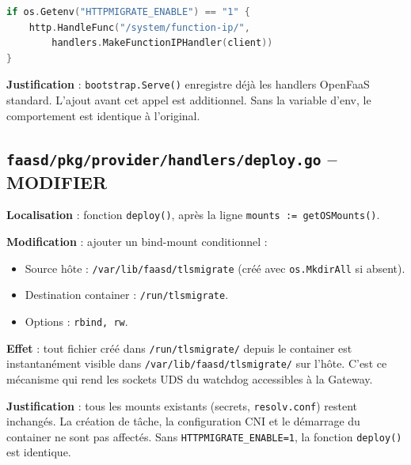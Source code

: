 \documentclass[11pt,a4paper]{article}
\begin{document}
\begin{lstlisting}[language=Go]
if os.Getenv("HTTPMIGRATE_ENABLE") == "1" {
    http.HandleFunc("/system/function-ip/",
        handlers.MakeFunctionIPHandler(client))
}
\end{lstlisting}

\textbf{Justification} : \texttt{bootstrap.Serve()} enregistre déjà les handlers
OpenFaaS standard. L'ajout avant cet appel est additionnel. Sans la variable d'env,
le comportement est identique à l'original.


\subsection{\texttt{faasd/pkg/provider/handlers/deploy.go} -- MODIFIER}
\label{sec:deploy}

\textbf{Localisation} : fonction \texttt{deploy()}, après la ligne \texttt{mounts := getOSMounts()}.

\textbf{Modification} : ajouter un bind-mount conditionnel :
\begin{itemize}
  \item Source hôte : \texttt{/var/lib/faasd/tlsmigrate} (créé avec \texttt{os.MkdirAll} si absent).
  \item Destination container : \texttt{/run/tlsmigrate}.
  \item Options : \texttt{rbind, rw}.
\end{itemize}

\textbf{Effet} : tout fichier créé dans \texttt{/run/tlsmigrate/} depuis le container est
instantanément visible dans \texttt{/var/lib/faasd/tlsmigrate/} sur l'hôte. C'est ce mécanisme
qui rend les sockets UDS du watchdog accessibles à la Gateway.

\textbf{Justification} : tous les mounts existants (secrets, \texttt{resolv.conf}) restent
inchangés. La création de tâche, la configuration CNI et le démarrage du container ne sont
pas affectés. Sans \texttt{HTTPMIGRATE\_ENABLE=1}, la fonction \texttt{deploy()} est identique.

\end{document}
